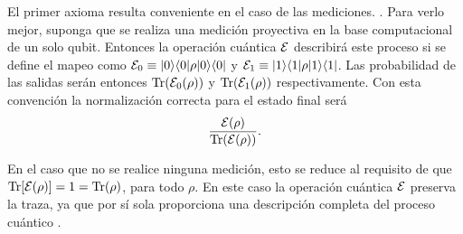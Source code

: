 El primer axioma resulta conveniente en  el caso de las mediciones. . Para verlo mejor, suponga que se realiza una medición
proyectiva en la base computacional de un solo qubit. Entonces la operación
cuántica $\mathcal{E}$ describirá este proceso si se define el mapeo como
$\mathcal{E}_0\equiv|0\rangle \langle0|\rho |0\rangle \langle 0|$ y $\mathcal{E}_1\equiv|1\rangle \langle1|\rho |1\rangle \langle 1|$.
Las probabilidad de las salidas serán entonces ${\rm Tr} (\mathcal{E}_0(\rho))$ y ${\rm Tr}
(\mathcal{E}_1(\rho))$ respectivamente.  Con esta convención la normalización correcta
para el estado final será \[\dfrac{\mathcal{E}(\rho)}{{\rm Tr} (\mathcal{E} (\rho))}.\]

En el caso que no se realice ninguna medición, esto se reduce al requisito de
que ${\rm Tr}[\mathcal{E}(\rho)] = 1 = {\rm Tr}(\rho)$, para todo $\rho$. En este caso la
operación cuántica $\mathcal{E}$ preserva la traza, ya que por sí sola proporciona una
descripción completa del proceso cuántico %
{\cite{nielsen_chuang_2010}}.

\begin{comment}
Asimismo, una razón física para proponer el segundo axioma, es que se espera que la evolución de un estado cuántico sea lineal debido a que de esa forma es compatible con la interpretación del operador de densidad como un ensamble de posibles estados. Supóngase que $\E$ mapea al estado inicial $\rho$  en el tiempo $t=0$ al estado final al tiempo $t=T$, el estado $\rho_i$ es preparado con una probabilidad $p_i$. Luego el estado de evolución temporal en $t = T$ será $\E(\rho_i )$ con probabilidad $p_i$, por lo tanto el estado final $\rho'$ evoluciona como \begin{equation}
\rho'= \sum_i p_i \E (\rho_i).
\end{equation}

Por otro lado, el estado inicial es descrito por $\sum_i p_i \rho$, que evoluciona así 
\begin{equation}
    \rho'= \E\left(\sum_i p_i \rho_i\right).
\end{equation} Igualando las dos ecuaciones anteriores, se tiene  que $\E$ debe actuar linealmente, en combinaciones convexas de estados {\cite{preskill2020quantum}}.
\end{comment}


